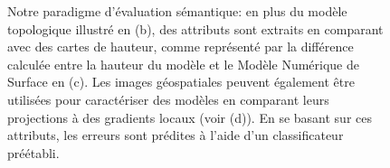 \documentclass[a4paper,french]{article}
\begin{document}
        \begin{figure}[H]
          \begin{center}
              
             \caption{\label{fig::pipeline} Notre paradigme d'évaluation sémantique: en plus du modèle topologique illustré en (b), des attributs sont extraits en comparant avec des cartes de hauteur, comme représenté par la différence calculée entre la hauteur du modèle et le Modèle Numérique de Surface en (c). Les images géospatiales peuvent également être utilisées pour caractériser des modèles en comparant leurs projections à des gradients locaux (voir (d)). En se basant sur ces attributs, les erreurs sont prédites à l'aide d'un classificateur préétabli.}
          \end{center}
    	\end{figure}
        
        \begin{spacing}{0.01}
            
        \end{spacing}
    
\end{document}
